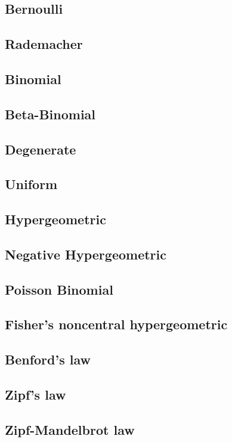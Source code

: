 \subsection{Bernoulli}
\subsection{Rademacher}
\subsection{Binomial}
\subsection{Beta-Binomial}
\subsection{Degenerate}
\subsection{Uniform}
\subsection{Hypergeometric}
\subsection{Negative Hypergeometric}
\subsection{Poisson Binomial}
\subsection{Fisher's noncentral hypergeometric}
\subsection{Benford's law}
\subsection{Zipf's law}
\subsection{Zipf-Mandelbrot law}

